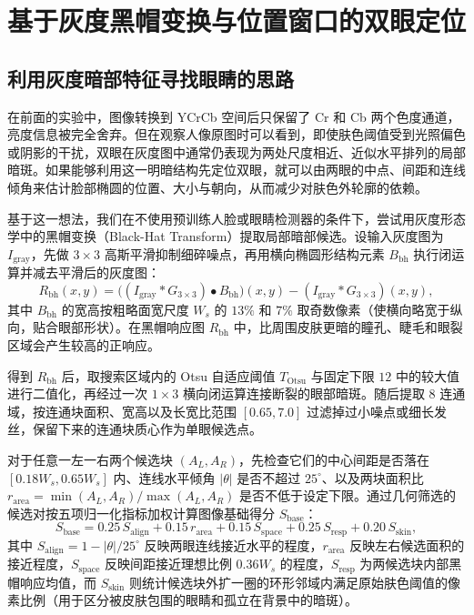 \section{基于灰度黑帽变换与位置窗口的双眼定位}\label{sec:eye}

\subsection{利用灰度暗部特征寻找眼睛的思路}

在前面的实验中，图像转换到 YCrCb 空间后只保留了 Cr 和 Cb 两个色度通道，亮度信息被完全舍弃。但在观察人像原图时可以看到，即使肤色阈值受到光照偏色或阴影的干扰，双眼在灰度图中通常仍表现为两处尺度相近、近似水平排列的局部暗斑\cite{hsu2002face}。如果能够利用这一明暗结构先定位双眼，就可以由两眼的中点、间距和连线倾角来估计脸部椭圆的位置、大小与朝向，从而减少对肤色外轮廓的依赖。

基于这一想法，我们在不使用预训练人脸或眼睛检测器的条件下，尝试用灰度形态学中的黑帽变换（Black-Hat Transform）提取局部暗部候选。设输入灰度图为 $I_{\text{gray}}$，先做 $3\times3$ 高斯平滑抑制细碎噪点，再用横向椭圆形结构元素 $B_{\text{bh}}$ 执行闭运算并减去平滑后的灰度图：
\begin{equation}
R_{\text{bh}}(x,y) = \bigl((I_{\text{gray}} * G_{3\times3}) \bullet B_{\text{bh}}\bigr)(x,y) - (I_{\text{gray}} * G_{3\times3})(x,y),
\label{eq:blackhat}
\end{equation}
其中 $B_{\text{bh}}$ 的宽高按粗略面宽尺度 $W_s$ 的 $13\%$ 和 $7\%$ 取奇数像素（使横向略宽于纵向，贴合眼部形状）。在黑帽响应图 $R_{\text{bh}}$ 中，比周围皮肤更暗的瞳孔、睫毛和眼裂区域会产生较高的正响应。

得到 $R_{\text{bh}}$ 后，取搜索区域内的 Otsu 自适应阈值 $T_{\text{Otsu}}$ 与固定下限 $12$ 中的较大值进行二值化，再经过一次 $1\times3$ 横向闭运算连接断裂的眼部暗斑。随后提取 8 连通域，按连通块面积、宽高以及长宽比范围 $[0.65, 7.0]$ 过滤掉过小噪点或细长发丝，保留下来的连通块质心作为单眼候选点。

对于任意一左一右两个候选块 $(A_L, A_R)$，先检查它们的中心间距是否落在 $[0.18W_s, 0.65W_s]$ 内、连线水平倾角 $|\theta|$ 是否不超过 $25^\circ$、以及两块面积比 $r_{\text{area}}=\min(A_L,A_R)/\max(A_L,A_R)$ 是否不低于设定下限。通过几何筛选的候选对按五项归一化指标加权计算图像基础得分 $S_{\text{base}}$：
\begin{equation}
S_{\text{base}} = 0.25\,S_{\text{align}} + 0.15\,r_{\text{area}} + 0.15\,S_{\text{space}} + 0.25\,S_{\text{resp}} + 0.20\,S_{\text{skin}},
\label{eq:eyebase}
\end{equation}
其中 $S_{\text{align}} = 1 - |\theta|/25^\circ$ 反映两眼连线接近水平的程度，$r_{\text{area}}$ 反映左右候选面积的接近程度，$S_{\text{space}}$ 反映间距接近理想比例 $0.36W_s$ 的程度，$S_{\text{resp}}$ 为两候选块内部黑帽响应均值，而 $S_{\text{skin}}$ 则统计候选块外扩一圈的环形邻域内满足原始肤色阈值的像素比例（用于区分被皮肤包围的眼睛和孤立在背景中的暗斑）。

